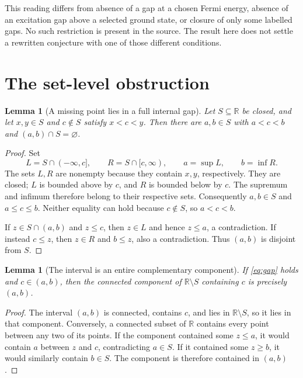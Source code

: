 \documentclass[11pt]{article}
\newtheorem{lemma}[theorem]{Lemma}
\newcommand{\R}{\mathbb R}
\begin{document}
This reading differs from absence of a gap at a chosen Fermi energy, absence
of an excitation gap above a selected ground state, or closure of only some
labelled gaps. No such restriction is present in the source. The result here
does not settle a rewritten conjecture with one of those different conditions.

\section{The set-level obstruction}

\begin{lemma}[A missing point lies in a full internal gap]\label{lem:gap}
Let $S\subseteq\R$ be closed, and let $x,y\in S$ and $c\notin S$ satisfy
$x<c<y$. Then there are $a,b\in S$ with $a<c<b$ and
$(a,b)\cap S=\varnothing$.
\end{lemma}
\begin{proof}
Set
\[
 L=S\cap(-\infty,c],\qquad R=S\cap[c,\infty),\qquad
 a=\sup L,\qquad b=\inf R.
\]
The sets $L,R$ are nonempty because they contain $x,y$, respectively.
They are closed; $L$ is bounded above by $c$, and $R$ is bounded below by $c$.
The supremum and infimum therefore belong to their respective sets.
Consequently $a,b\in S$ and $a\leq c\leq b$. Neither equality can hold because
$c\notin S$, so $a<c<b$.

If $z\in S\cap(a,b)$ and $z\leq c$, then $z\in L$ and hence $z\leq a$,
a contradiction. If instead $c\leq z$, then $z\in R$ and $b\leq z$, also a
contradiction. Thus $(a,b)$ is disjoint from $S$.
\end{proof}

\begin{lemma}[The interval is an entire complementary component]\label{lem:component}
If \eqref{eq:gap} holds and $c\in(a,b)$, then the connected component of
$\R\setminus S$ containing $c$ is precisely $(a,b)$.
\end{lemma}
\begin{proof}
The interval $(a,b)$ is connected, contains $c$, and lies in $\R\setminus S$,
so it lies in that component. Conversely, a connected subset of $\R$ contains
every point between any two of its points. If the component contained some
$z\leq a$, it would contain $a$ between $z$ and $c$, contradicting $a\in S$.
If it contained some $z\geq b$, it would similarly contain $b\in S$.
The component is therefore contained in $(a,b)$.
\end{proof}
\end{document}
